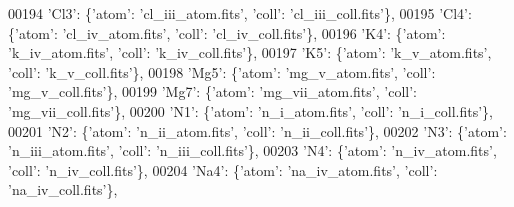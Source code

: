 \begin{DoxyCode}
00194                             \textcolor{stringliteral}{'Cl3'}: \{\textcolor{stringliteral}{'atom'}: \textcolor{stringliteral}{'cl\_iii\_atom.fits'}, \textcolor{stringliteral}{'coll'}: \textcolor{stringliteral}{'cl\_iii\_coll.fits'}\},
00195                             \textcolor{stringliteral}{'Cl4'}: \{\textcolor{stringliteral}{'atom'}: \textcolor{stringliteral}{'cl\_iv\_atom.fits'}, \textcolor{stringliteral}{'coll'}: \textcolor{stringliteral}{'cl\_iv\_coll.fits'}\},
00196                             \textcolor{stringliteral}{'K4'}: \{\textcolor{stringliteral}{'atom'}: \textcolor{stringliteral}{'k\_iv\_atom.fits'}, \textcolor{stringliteral}{'coll'}: \textcolor{stringliteral}{'k\_iv\_coll.fits'}\},
00197                             \textcolor{stringliteral}{'K5'}: \{\textcolor{stringliteral}{'atom'}: \textcolor{stringliteral}{'k\_v\_atom.fits'}, \textcolor{stringliteral}{'coll'}: \textcolor{stringliteral}{'k\_v\_coll.fits'}\},
00198                             \textcolor{stringliteral}{'Mg5'}: \{\textcolor{stringliteral}{'atom'}: \textcolor{stringliteral}{'mg\_v\_atom.fits'}, \textcolor{stringliteral}{'coll'}: \textcolor{stringliteral}{'mg\_v\_coll.fits'}\},
00199                             \textcolor{stringliteral}{'Mg7'}: \{\textcolor{stringliteral}{'atom'}: \textcolor{stringliteral}{'mg\_vii\_atom.fits'}, \textcolor{stringliteral}{'coll'}: \textcolor{stringliteral}{'mg\_vii\_coll.fits'}\},
00200                             \textcolor{stringliteral}{'N1'}: \{\textcolor{stringliteral}{'atom'}: \textcolor{stringliteral}{'n\_i\_atom.fits'}, \textcolor{stringliteral}{'coll'}: \textcolor{stringliteral}{'n\_i\_coll.fits'}\},
00201                             \textcolor{stringliteral}{'N2'}: \{\textcolor{stringliteral}{'atom'}: \textcolor{stringliteral}{'n\_ii\_atom.fits'}, \textcolor{stringliteral}{'coll'}: \textcolor{stringliteral}{'n\_ii\_coll.fits'}\},
00202                             \textcolor{stringliteral}{'N3'}: \{\textcolor{stringliteral}{'atom'}: \textcolor{stringliteral}{'n\_iii\_atom.fits'}, \textcolor{stringliteral}{'coll'}: \textcolor{stringliteral}{'n\_iii\_coll.fits'}\},
00203                             \textcolor{stringliteral}{'N4'}: \{\textcolor{stringliteral}{'atom'}: \textcolor{stringliteral}{'n\_iv\_atom.fits'}, \textcolor{stringliteral}{'coll'}: \textcolor{stringliteral}{'n\_iv\_coll.fits'}\},
00204                             \textcolor{stringliteral}{'Na4'}: \{\textcolor{stringliteral}{'atom'}: \textcolor{stringliteral}{'na\_iv\_atom.fits'}, \textcolor{stringliteral}{'coll'}: \textcolor{stringliteral}{'na\_iv\_coll.fits'}\},

\end{DoxyCode}
